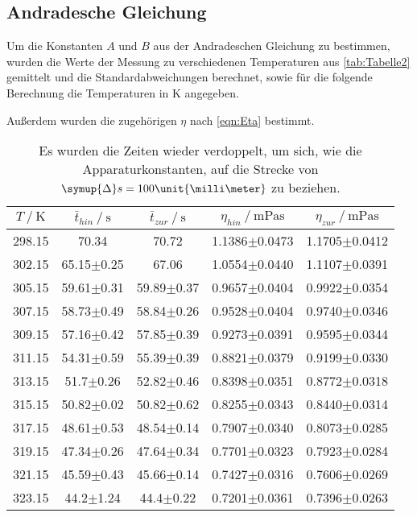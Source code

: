 \subsection{Andradesche Gleichung}

Um die Konstanten $A$ und $B$ aus der Andradeschen Gleichung zu bestimmen, wurden die Werte der Messung zu verschiedenen Temperaturen aus \autoref{tab:Tabelle2}
gemittelt und die Standardabweichungen berechnet, sowie für die folgende
Berechnung die Temperaturen in $\unit{\kelvin}$ angegeben. 

Außerdem wurden die zugehörigen $\eta$ nach \eqref{eqn:Eta} bestimmt.


\begin{table}[H]
  \centering
  \caption{Es wurden die Zeiten wieder verdoppelt, um sich, wie die Apparaturkonstanten, auf die Strecke 
  von $\symup{\Delta}s=100\unit{\milli\meter}$ zu beziehen.}
  \begin{tabular}{ccccc}
    \toprule
    {$T \mathbin{/} \unit{\kelvin}$} &
    {$\bar{t}_{hin} \mathbin{/} \unit{\second}$} &
    {$\bar{t}_{zur} \mathbin{/} \unit{\second}$} &
    {$\eta_{hin} \mathbin{/} \unit{\milli\pascal\second}$} &
    {$\eta_{zur} \mathbin{/} \unit{\milli\pascal\second}$} \\
    \midrule
    298.15 & 70.34          & 70.72          & 1.1386$\pm$0.0473 & 1.1705$\pm$0.0412 \\
    302.15 & 65.15$\pm$0.25 & 67.06          & 1.0554$\pm$0.0440 & 1.1107$\pm$0.0391 \\
    305.15 & 59.61$\pm$0.31 & 59.89$\pm$0.37 & 0.9657$\pm$0.0404 & 0.9922$\pm$0.0354 \\
    307.15 & 58.73$\pm$0.49 & 58.84$\pm$0.26 & 0.9528$\pm$0.0404 & 0.9740$\pm$0.0346 \\
    309.15 & 57.16$\pm$0.42 & 57.85$\pm$0.39 & 0.9273$\pm$0.0391 & 0.9595$\pm$0.0344 \\
    311.15 & 54.31$\pm$0.59 & 55.39$\pm$0.39 & 0.8821$\pm$0.0379 & 0.9199$\pm$0.0330 \\
    313.15 & 51.7$\pm$0.26  & 52.82$\pm$0.46 & 0.8398$\pm$0.0351 & 0.8772$\pm$0.0318 \\
    315.15 & 50.82$\pm$0.02 & 50.82$\pm$0.62 & 0.8255$\pm$0.0343 & 0.8440$\pm$0.0314 \\
    317.15 & 48.61$\pm$0.53 & 48.54$\pm$0.14 & 0.7907$\pm$0.0340 & 0.8073$\pm$0.0285 \\
    319.15 & 47.34$\pm$0.26 & 47.64$\pm$0.34 & 0.7701$\pm$0.0323 & 0.7923$\pm$0.0284 \\
    321.15 & 45.59$\pm$0.43 & 45.66$\pm$0.14 & 0.7427$\pm$0.0316 & 0.7606$\pm$0.0269 \\
    323.15 & 44.2$\pm$1.24  & 44.4$\pm$0.22  & 0.7201$\pm$0.0361 & 0.7396$\pm$0.0263 \\
    \bottomrule
  \end{tabular}
  \label{tab:Tabelle3}
\end{table}
